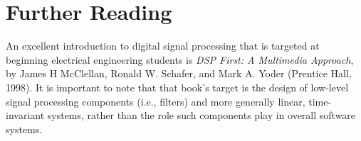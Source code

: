 \section*{Further Reading}

An excellent introduction to digital signal processing that is
targeted at beginning electrical engineering students is \textit{DSP
  First: A Multimedia Approach}, by James H McClellan, Ronald
W. Schafer, and Mark A. Yoder (Prentice Hall, 1998).  It is important
to note that that book's target is the design of low-level signal
processing components (i.e., filters) and more generally linear,
time-invariant systems, rather than the role such components play in
overall software systems.

